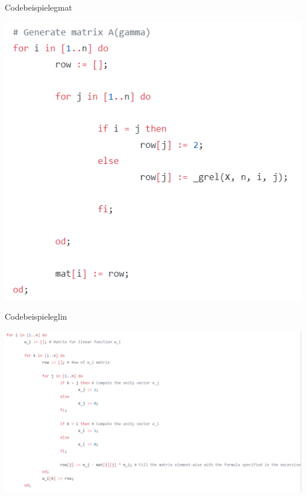\documentclass[9pt]{beamer}
\begin{document}
\begin{frame}{Codebeispiele}{gmat}
\begin{center}
\includegraphics[scale=0.75]{assets/gmat_code.png}
\end{center}
\end{frame}

\begin{frame}{Codebeispiele}{glin}
\begin{center}
\includegraphics[scale=0.5]{assets/glin_code.png}
\end{center}
\end{frame}
\end{document}
